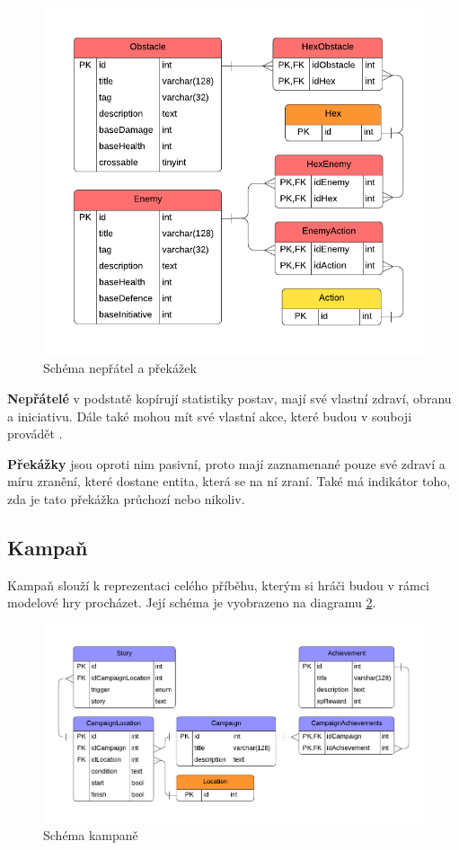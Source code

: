 \begin{figure}[h]
    \centering
    \includegraphics[scale=0.8]{../../shared/diagrams/er_enemy_obstacle.pdf}
    \caption{Schéma nepřátel a překážek}
    \label{diag:er_enemy_obstacle}
\end{figure}

\textbf{Nepřátelé} v podstatě kopírují statistiky postav, mají své vlastní zdraví, obranu a iniciativu. Dále také mohou mít své vlastní akce, které budou v souboji provádět .

\textbf{Překážky} jsou oproti nim pasivní, proto mají zaznamenané pouze své zdraví a míru zranění, které dostane entita, která se na ní zraní. Také má indikátor toho, zda je tato překážka průchozí  nebo nikoliv.


\subsection{Kampaň}
\label{subsec:schema_campaign}

Kampaň slouží k reprezentaci celého příběhu, kterým si hráči budou v rámci modelové hry procházet. Její schéma je vyobrazeno na diagramu \ref{diag:er_campaign}.

\begin{figure}[h]
    \centering
    \includegraphics[scale=0.8]{../../shared/diagrams/er_campaign.pdf}
    \caption{Schéma kampaně}
    \label{diag:er_campaign}
\end{figure}

